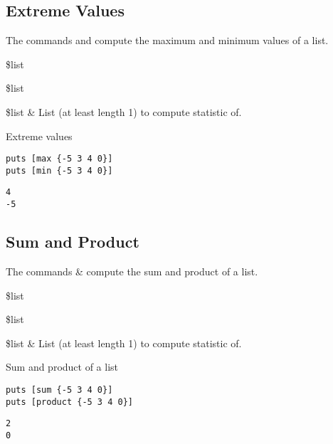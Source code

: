 \documentclass{article}
\begin{document}
\subsection{Extreme Values}
The commands  and  compute the maximum and minimum values of a list.
\begin{syntax}
 \$list 
\end{syntax}
\begin{syntax}
 \$list 
\end{syntax}
\begin{args}
\$list & List (at least length 1) to compute statistic of. 
\end{args}
\begin{example}{Extreme values}
\begin{lstlisting}
puts [max {-5 3 4 0}]
puts [min {-5 3 4 0}]
\end{lstlisting}
\tcblower
\begin{lstlisting}
4
-5
\end{lstlisting}
\end{example}
\clearpage
\subsection{Sum and Product}
The commands  \&  compute the sum and product of a list.
\begin{syntax}
 \$list
\end{syntax}
\begin{syntax}
 \$list
\end{syntax}
\begin{args}
\$list & List (at least length 1) to compute statistic of. 
\end{args}
\begin{example}{Sum and product of a list}
\begin{lstlisting}
puts [sum {-5 3 4 0}]
puts [product {-5 3 4 0}]
\end{lstlisting}
\tcblower
\begin{lstlisting}
2
0
\end{lstlisting}
\end{example}
\end{document}
